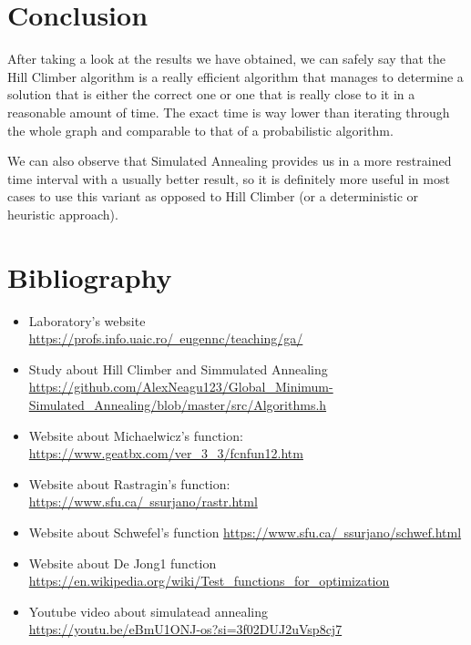 \documentclass{article}
\begin{document}
\newpage
\section{Conclusion}

After taking a look at the results we have obtained, we can safely say that the Hill Climber algorithm is a really efficient algorithm that manages to determine a solution that is either the correct one or one that is really close to it in a reasonable amount of time. The exact time is way lower than iterating through the whole graph and comparable to that of a probabilistic algorithm.

We can also observe that Simulated Annealing provides us in a more restrained time interval with a usually better result, so it is definitely more useful in most cases to use this variant as opposed to Hill Climber (or a deterministic or heuristic approach).  

\section{Bibliography}

\begin{itemize}
\item Laboratory’s website \\
\href{URL}{https://profs.info.uaic.ro/~eugennc/teaching/ga/}
\item Study about Hill Climber and Simmulated Annealing \\
\href{URL}{https://github.com/AlexNeagu123/Global\_Minimum-Simulated\_Annealing/blob/master/src/Algorithms.h}
\item Website about Michaelwicz’s function: \\
\href{URL}{https://www.geatbx.com/ver\_3\_3/fcnfun12.htm}
\item Website about Rastragin’s function: \\
\href{URL}{https://www.sfu.ca/~ssurjano/rastr.html}
\item Website about Schwefel’s function
\href{URL}{https://www.sfu.ca/~ssurjano/schwef.html}
\item Website about De Jong1 function \\
\href{URL}{https://en.wikipedia.org/wiki/Test\_functions\_for\_optimization}
\item Youtube video about simulatead annealing \\
\href{URL}{https://youtu.be/eBmU1ONJ-os?si=3f02DUJ2uVsp8cj7}

\end{itemize}
\end{document}
